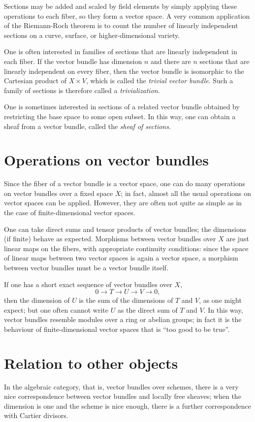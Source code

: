 \documentclass[12pt]{article}
\begin{document}
Sections may be added and scaled by field elements by simply applying these operations to each fiber, so they form a vector space.  A very common application of the Riemann-Roch theorem is to count the number of linearly independent sections on a curve, surface, or higher-dimensional variety.  

One is often interested in families of sections that are linearly independent in each fiber.  If the vector bundle has dimension $n$ and there are $n$ sections that are linearly independent on every fiber, then the vector bundle is isomorphic to the Cartesian product of $X\times V$, which is called the \emph{trivial vector bundle}.  Such a family of sections is therefore called a \emph{trivialization}.

One is sometimes interested in sections of a related vector bundle obtained by restricting the base space to some open subset.  In this way, one can obtain a sheaf from a vector bundle, called the \emph{sheaf of sections}.

\section*{Operations on vector bundles}

Since the fiber of a vector bundle is a vector space, one can do many operations on vector bundles over a fixed space $X$; in fact, almost all the usual operations on vector spaces can be applied.  However, they are often not quite as simple as in the case of finite-dimensional vector spaces.

One can take direct sums and tensor products of vector bundles; the dimensions (if finite) behave as expected.  Morphisms between vector bundles over $X$ are just linear maps on the fibers, with appropriate continuity conditions: since the space of linear maps between two vector spaces is again a vector space, a morphism between vector bundles must be a vector bundle itself.

If one has a short exact sequence of vector bundles over $X$,
\[
0 \to T \to U \to V \to 0,
\]
then the dimension of $U$ is the sum of the dimensions of $T$ and $V$, as one might expect; but one often cannot write $U$ as the direct sum of $T$ and $V$.  In this way, vector bundles resemble modules over a ring or abelian groups; in fact it is the behaviour of finite-dimensional vector spaces that is ``too good to be true''. 

\section*{Relation to other objects}

In the algebraic category, that is, vector bundles over schemes, there is a very nice correspondence between vector bundles and locally free sheaves; when the dimension is one and the scheme is nice enough, there is a further correspondence with Cartier divisors.
\end{document}
